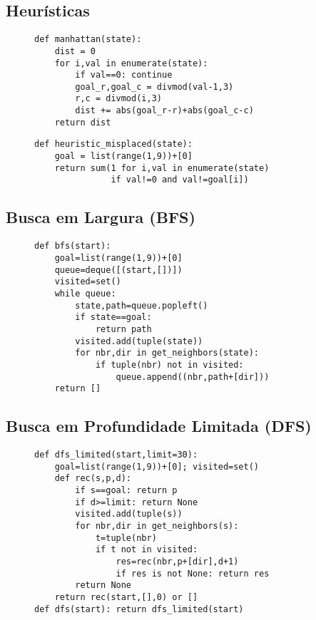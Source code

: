 \documentclass[sigconf]{acmart}
\begin{document}
\subsection{Heurísticas}
\begin{figure}[H]
\centering
\begin{lstlisting}[caption={Heurística Manhattan}]
def manhattan(state):
    dist = 0
    for i,val in enumerate(state):
        if val==0: continue
        goal_r,goal_c = divmod(val-1,3)
        r,c = divmod(i,3)
        dist += abs(goal_r-r)+abs(goal_c-c)
    return dist
\end{lstlisting}
\begin{lstlisting}[caption={Heurística Peças Fora do Lugar}]
def heuristic_misplaced(state):
    goal = list(range(1,9))+[0]
    return sum(1 for i,val in enumerate(state)
               if val!=0 and val!=goal[i])
\end{lstlisting}
\end{figure}

\subsection{Busca em Largura (BFS)}
\begin{figure}[H]
\centering
\begin{lstlisting}[caption={Implementação BFS}]
def bfs(start):
    goal=list(range(1,9))+[0]
    queue=deque([(start,[])])
    visited=set()
    while queue:
        state,path=queue.popleft()
        if state==goal:
            return path
        visited.add(tuple(state))
        for nbr,dir in get_neighbors(state):
            if tuple(nbr) not in visited:
                queue.append((nbr,path+[dir]))
    return []
\end{lstlisting}
\end{figure}

\subsection{Busca em Profundidade Limitada (DFS)}
\begin{figure}[H]
\centering
\begin{lstlisting}[caption={Implementação DFS com limite}] 
def dfs_limited(start,limit=30):
    goal=list(range(1,9))+[0]; visited=set()
    def rec(s,p,d):
        if s==goal: return p
        if d>=limit: return None
        visited.add(tuple(s))
        for nbr,dir in get_neighbors(s):
            t=tuple(nbr)
            if t not in visited:
                res=rec(nbr,p+[dir],d+1)
                if res is not None: return res
        return None
    return rec(start,[],0) or []
def dfs(start): return dfs_limited(start)
\end{lstlisting}
\end{figure}
\end{document}
